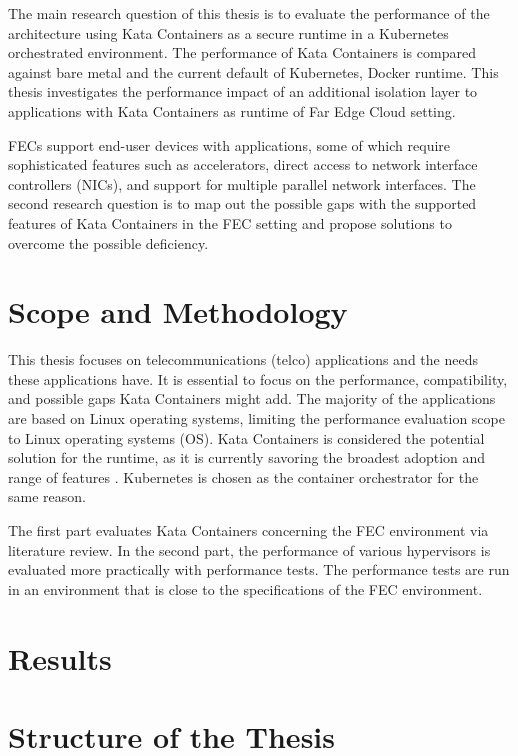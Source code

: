 The main research question of this thesis is to evaluate the performance of the architecture using Kata Containers as a secure runtime in a Kubernetes orchestrated environment. The performance of Kata Containers is compared against bare metal and the current default of Kubernetes, Docker runtime. This thesis investigates the performance impact of an additional isolation layer to applications with Kata Containers as runtime of Far Edge Cloud setting.

FECs support end-user devices with applications, some of which require sophisticated features such as accelerators, direct access to network interface controllers (NICs), and support for multiple parallel network interfaces. The second research question is to map out the possible gaps with the supported features of Kata Containers in the FEC setting and propose solutions to overcome the possible deficiency.

\section{Scope and Methodology}
\label{section:intro_scopemethodology}

This thesis focuses on telecommunications (telco) applications and the needs these applications have. It is essential to focus on the performance, compatibility, and possible gaps Kata Containers might add. The majority of the applications are based on Linux operating systems, limiting the performance evaluation scope to Linux operating systems (OS). Kata Containers is considered the potential solution for the runtime, as it is currently savoring the broadest adoption and range of features \cite{Flauzac2020}. Kubernetes is chosen as the container orchestrator for the same reason.

The first part evaluates Kata Containers concerning the FEC environment via literature review. In the second part, the performance of various hypervisors is evaluated more practically with performance tests. The performance tests are run in an environment that is close to the specifications of the FEC environment.

\section{Results}
\label{section:intro_results}

\section{Structure of the Thesis}
\label{section:intro_structure}

